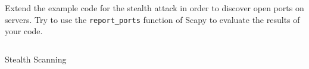 \documentclass[11pt,a4paper]{article}
\begin{document}
\begin{question}
Extend the example code for the stealth attack in order to discover open ports on servers.
Try to use the \texttt{report\_ports} function of Scapy to evaluate the results of your code.
\end{question}


\begin{listing}[h]
\inputminted{python}{../code_students/stealth_scanning.py}
\caption{Stealth Scanning}%
\label{listing:stealth-scanning}
\end{listing}






\end{document}
